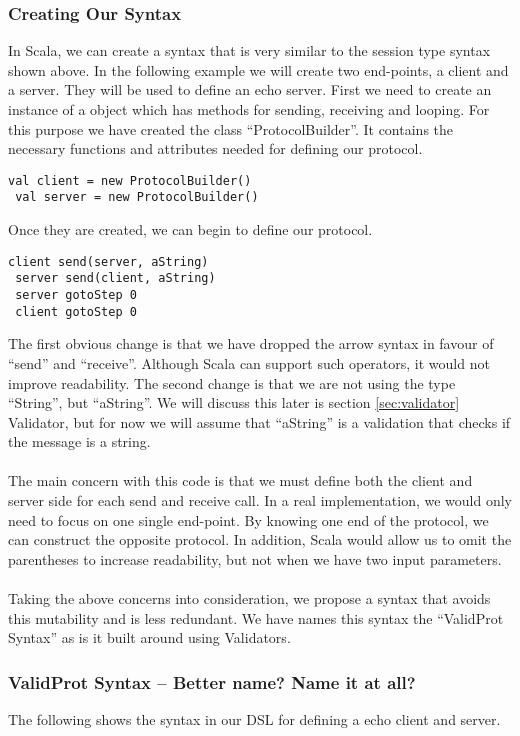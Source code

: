 \subsubsection{Creating Our Syntax}
In Scala, we can create a syntax that is very similar to the session type syntax shown above. In the following example we will create two end-points, a client and a server. They will be used to define an echo server. First we need to create an instance of a object which has methods for sending, receiving and looping. For this purpose we have created the class ``ProtocolBuilder''. It contains the necessary functions and attributes needed for defining our protocol.
\begin{lstlisting}[style=myScalastyle]
 val client = new ProtocolBuilder()
 val server = new ProtocolBuilder()
\end{lstlisting}
Once they are created, we can begin to define our protocol.
\begin{lstlisting}[style=myScalastyle]
 client send(server, aString)
 server send(client, aString)
 server gotoStep 0
 client gotoStep 0 
\end{lstlisting}
The first obvious change is that we have dropped the arrow syntax in favour of ``send'' and ``receive''. Although Scala can support such operators, it would not improve readability. The second change is that we are not using the type ``String'', but ``aString''. We will discuss this later is section {\ref{sec:validator} Validator}, but for now we will assume that ``aString'' is a validation that checks if the message is a string.   
\\\\
The main concern with this code is that we must define both the client and server side for each send and receive call. In a real implementation, we would only need to focus on one single end-point. By knowing one end of the protocol, we can construct the opposite protocol. In addition, Scala would allow us to omit the parentheses to increase readability, but not when we have two input parameters.
\\\\
Taking the above concerns into consideration, we propose a syntax that avoids this mutability and is less redundant. We have names this syntax the ``ValidProt Syntax'' as is it built around using Validators. 

\subsubsection{ValidProt Syntax -- Better name? Name it at all?}
The following shows the syntax in our DSL for defining a echo client and server.

